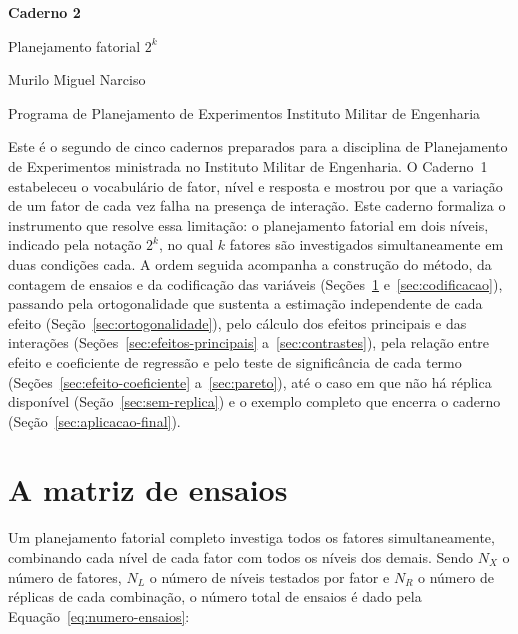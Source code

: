 \documentclass{doeapostila}
\begin{document}
\begin{center}
  {\LARGE\bfseries Caderno 2}\par\smallskip
  {\Large Planejamento fatorial $2^{k}$}\par\smallskip
  {\normalsize Murilo Miguel Narciso}\par\smallskip
  {\footnotesize Programa de Planejamento de Experimentos \textbullet{} Instituto Militar de Engenharia}
\end{center}

\vspace{0.6\baselineskip}

\noindent
Este é o segundo de cinco cadernos preparados para a disciplina de
Planejamento de Experimentos ministrada no Instituto Militar de Engenharia.
O Caderno~1 estabeleceu o vocabulário de fator, nível e resposta e mostrou
por que a variação de um fator de cada vez falha na presença de interação.
Este caderno formaliza o instrumento que resolve essa limitação: o
planejamento fatorial em dois níveis, indicado pela notação $2^{k}$, no qual
$k$ fatores são investigados simultaneamente em duas condições cada. A ordem
seguida acompanha a construção do método, da contagem de ensaios e da
codificação das variáveis (Seções~\ref{sec:matriz-ensaios}
e~\ref{sec:codificacao}), passando pela ortogonalidade que sustenta a
estimação independente de cada efeito (Seção~\ref{sec:ortogonalidade}), pelo
cálculo dos efeitos principais e das interações
(Seções~\ref{sec:efeitos-principais} a~\ref{sec:contrastes}), pela relação
entre efeito e coeficiente de regressão e pelo teste de significância de
cada termo (Seções~\ref{sec:efeito-coeficiente}
a~\ref{sec:pareto}), até o caso em que não há réplica disponível
(Seção~\ref{sec:sem-replica}) e o exemplo completo que encerra o caderno
(Seção~\ref{sec:aplicacao-final}).

\vspace{0.6\baselineskip}

\tableofcontents

\section{A matriz de ensaios}
\label{sec:matriz-ensaios}

Um planejamento fatorial completo investiga todos os fatores simultaneamente,
combinando cada nível de cada fator com todos os níveis dos demais. Sendo
$N_X$ o número de fatores, $N_L$ o número de níveis testados por fator e
$N_R$ o número de réplicas de cada combinação, o número total de ensaios é
dado pela Equação~\eqref{eq:numero-ensaios}:
\end{document}
